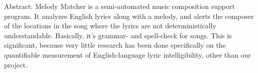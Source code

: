 \documentclass[10pt,oneside]{memoir}
\title{\mytitle}
\author{\myauthor}
\def\mychapterstyle{default}
\def\mypagestyle{headings}
\def\revision{}
\begin{document}
\chapterstyle{\mychapterstyle}
\pagestyle{\mypagestyle}

%
%

\frontmatter



\maketitle
\clearpage

\vspace*{\fill}

\setlength{\parindent}{0pt}

\ifx\mycopyright\undefined
\else
  \textcopyright{} \mycopyright
\fi

\revision

\begin{center}
\end{center}

\setlength{\parindent}{1em}
\clearpage

\tableofcontents


%
%


\setlength{\parindent}{1em}

\mainmatter
Abstract:
Melody Matcher is a semi-automated music composition support program. It analyzes English lyrics along with a melody, and alerts the composer of the locations in the song where the lyrics are not deterministically understandable. Basically, it's grammar- and spell-check for songs. This is significant, because very little research has been done specifically on the quantifiable measurement of English-language lyric intelligibility, other than our project.
\end{document}
